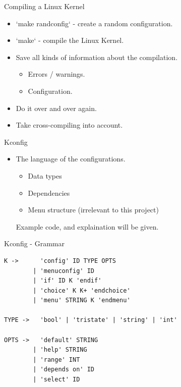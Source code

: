 \documentclass[mathserif,serif]{beamer}
\newenvironment{items}{
\begin{itemize}
  \setlength{\itemsep}{0pt}
  \setlength{\parskip}{7pt}
  \setlength{\parsep}{4pt}
}{\end{itemize}}
\begin{document}
\begin{frame}[t]{Compiling a Linux Kernel}

    \begin{items}
        \item `make randconfig` - create a random configuration.
        \item `make` - compile the Linux Kernel.
        \item Save all kinds of information about the compilation.
        \begin{items}
            \item Errors / warnings.
            \item Configuration.
        \end{items}
        \item Do it over and over again.
        \item Take cross-compiling into account.
    \end{items}


\end{frame}

\begin{frame}[t]{Kconfig}

    \begin{items}
        \item The language of the configurations.
        \begin{items}
            \item Data types
            \item Dependencies
            \item Menu structure (irrelevant to this project)
        \end{items}


    Example code, and explaination will be given.
    \end{items}
\end{frame}

\begin{frame}[t,fragile]{Kconfig - Grammar}
    \begin{lstlisting}
K ->      'config' ID TYPE OPTS
        | 'menuconfig' ID
        | 'if' ID K 'endif'
        | 'choice' K K+ 'endchoice'
        | 'menu' STRING K 'endmenu'

TYPE ->   'bool' | 'tristate' | 'string' | 'int'

OPTS ->   'default' STRING
        | 'help' STRING
        | 'range' INT
        | 'depends on' ID
        | 'select' ID
    \end{lstlisting}
\end{frame}
\end{document}
